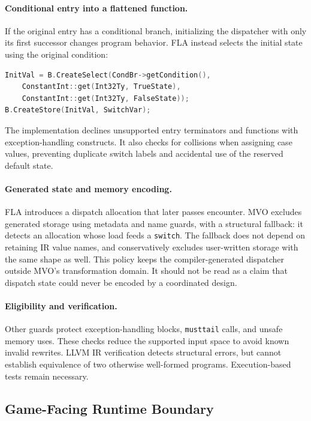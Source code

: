 \documentclass[conference]{IEEEtran}
\begin{document}
\paragraph{Conditional entry into a flattened function.}
If the original entry has a conditional branch, initializing the
dispatcher with only its first successor changes program behavior.
FLA instead selects the initial state using the original condition:
\begin{lstlisting}[language=C++]
InitVal = B.CreateSelect(CondBr->getCondition(),
    ConstantInt::get(Int32Ty, TrueState),
    ConstantInt::get(Int32Ty, FalseState));
B.CreateStore(InitVal, SwitchVar);
\end{lstlisting}
The implementation declines unsupported entry terminators and
functions with exception-handling constructs. It also checks for
collisions when assigning case values, preventing duplicate switch
labels and accidental use of the reserved default state.

\paragraph{Generated state and memory encoding.}
FLA introduces a dispatch allocation that later passes encounter.
MVO excludes generated storage using metadata and name guards, with
a structural fallback: it detects an allocation whose load feeds a
\texttt{switch}. The fallback does not depend on retaining IR value
names, and conservatively excludes user-written storage with the same
shape as well. This policy keeps the compiler-generated dispatcher
outside MVO's transformation domain. It should not be read as a claim
that dispatch state could never be encoded by a coordinated design.

\paragraph{Eligibility and verification.}
Other guards protect exception-handling blocks, \texttt{musttail}
calls, and unsafe memory uses. These checks reduce the supported input
space to avoid known invalid rewrites. LLVM IR verification detects
structural errors, but cannot establish equivalence of two otherwise
well-formed programs. Execution-based tests remain necessary.

\subsection{Game-Facing Runtime Boundary}
\end{document}
